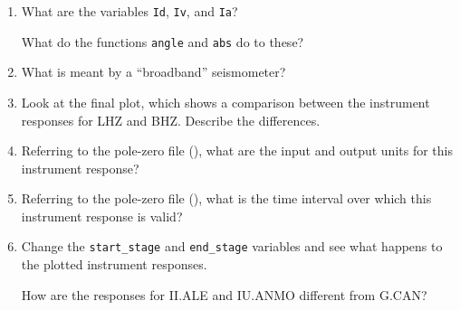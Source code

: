 \documentclass[11pt,titlepage,fleqn]{article}
\begin{document}
\begin{enumerate}

\item What are the variables \verb+Id+, \verb+Iv+, and \verb+Ia+?

What do the functions \verb+angle+ and \verb+abs+ do to these?

\item What is meant by a ``broadband'' seismometer?

\item Look at the final plot, which shows a comparison between the instrument responses for LHZ and BHZ. Describe the differences.

\item Referring to the pole-zero file (), what are the input and output units for this instrument response?

\item Referring to the pole-zero file (), what is the time interval over which this instrument response is valid?

\item Change the \verb+start_stage+ and \verb+end_stage+ variables and see what happens to the plotted instrument responses.

How are the responses for II.ALE and IU.ANMO different from G.CAN?

\end{enumerate}


\iffalse
\section{Deconvolve instrument response for a seismogram}

FUTURE PART OF THE LAB (see also \verb+lab_sumatra.pdf+):
%
\begin{verbatim}
otime = 2004-12-26 00:58:50 = 732307.040856 [matlab days]
station CAN.G
duration = 10 days
start time: t1 = otime - duration - 1
end time: t2 = t1 + duration
channels: LHZ, LHE, LHN

Deconvolve instrument response on all three components.
Plot the amplitude spectrum over 0.2--1.0 mHz to show the gravest mode peaks.
Show what the main arrival looks like at bandpass 50-500s with and without decon.
Rotate to R and T to isolate SH waves.
[Having the previous 10 days allows for the noise analysis in hw_sumatraA.pdf]
\end{verbatim}
\fi
\end{document}
